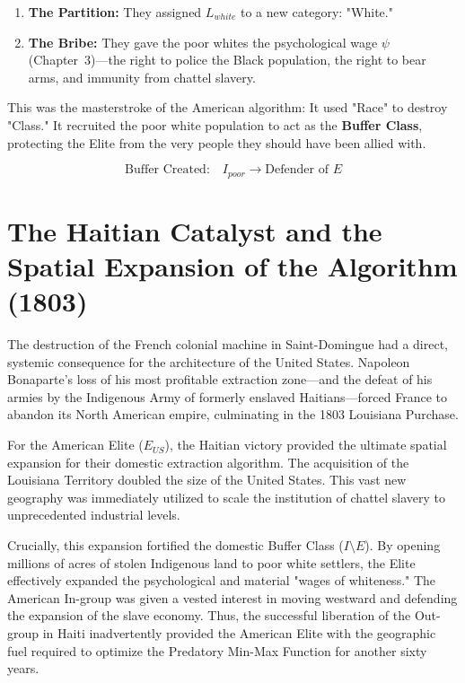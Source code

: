 \documentclass[12pt,openany]{book}
\begin{document}
\begin{enumerate}
    \item \textbf{The Partition:} They assigned $L_{white}$ to a new category: "White."
    \item \textbf{The Bribe:} They gave the poor whites the psychological wage $\psi$ (Chapter~3)---the right to police the Black population, the right to bear arms, and immunity from chattel slavery.
\end{enumerate}

This was the masterstroke of the American algorithm: It used "Race" to destroy "Class." It recruited the poor white population to act as the \textbf{Buffer Class}, protecting the Elite from the very people they should have been allied with.

\[
\text{Buffer Created:} \quad I_{poor} \rightarrow \text{Defender of } E
\]

\section{The Haitian Catalyst and the Spatial Expansion of the Algorithm (1803)}

The destruction of the French colonial machine in Saint-Domingue had a direct, systemic consequence for the architecture of the United States. Napoleon Bonaparte’s loss of his most profitable extraction zone—and the defeat of his armies by the Indigenous Army of formerly enslaved Haitians—forced France to abandon its North American empire, culminating in the 1803 Louisiana Purchase.

For the American Elite ($E_{US}$), the Haitian victory provided the ultimate spatial expansion for their domestic extraction algorithm. The acquisition of the Louisiana Territory doubled the size of the United States. This vast new geography was immediately utilized to scale the institution of chattel slavery to unprecedented industrial levels.

Crucially, this expansion fortified the domestic Buffer Class ($I \setminus E$). By opening millions of acres of stolen Indigenous land to poor white settlers, the Elite effectively expanded the psychological and material "wages of whiteness." The American In-group was given a vested interest in moving westward and defending the expansion of the slave economy. Thus, the successful liberation of the Out-group in Haiti inadvertently provided the American Elite with the geographic fuel required to optimize the Predatory Min-Max Function for another sixty years.
\end{document}
